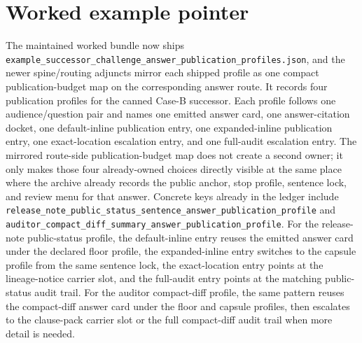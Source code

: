 \documentclass[11pt]{article}
\begin{document}
\section{Worked example pointer}
The maintained worked bundle now ships \texttt{example\_successor\_challenge\_answer\_publication\_profiles.json}, and the newer spine/routing adjuncts mirror each shipped profile as one compact publication-budget map on the corresponding answer route.\cite{series:workedexample}
It records four publication profiles for the canned Case-B successor.
Each profile follows one audience/question pair and names one emitted answer card, one answer-citation docket, one default-inline publication entry, one expanded-inline publication entry, one exact-location escalation entry, and one full-audit escalation entry. The mirrored route-side publication-budget map does not create a second owner; it only makes those four already-owned choices directly visible at the same place where the archive already records the public anchor, stop profile, sentence lock, and review menu for that answer.
Concrete keys already in the ledger include \texttt{release\_note\_public\_status\_sentence\_answer\_publication\_profile} and \texttt{auditor\_compact\_diff\_summary\_answer\_publication\_profile}.
For the release-note public-status profile, the default-inline entry reuses the emitted answer card under the declared floor profile, the expanded-inline entry switches to the capsule profile from the same sentence lock, the exact-location entry points at the lineage-notice carrier slot, and the full-audit entry points at the matching public-status audit trail.
For the auditor compact-diff profile, the same pattern reuses the compact-diff answer card under the floor and capsule profiles, then escalates to the clause-pack carrier slot or the full compact-diff audit trail when more detail is needed.
\end{document}

